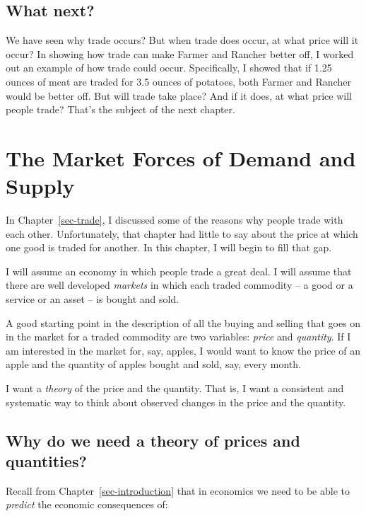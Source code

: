 \documentclass[
  letterpaper,
]{book}
\begin{document}
\section{What next?}\label{what-next}

We have seen why trade occurs? But when trade does occur, at what price
will it occur? In showing how trade can make Farmer and Rancher better
off, I worked out an example of how trade could occur. Specifically, I
showed that if 1.25 ounces of meat are traded for 3.5 ounces of
potatoes, both Farmer and Rancher would be better off. But will trade
take place? And if it does, at what price will people trade? That's the
subject of the next chapter.


\chapter{The Market Forces of Demand and
Supply}\label{sec-supply_demand}

In Chapter~\ref{sec-trade}, I discussed some of the reasons why people
trade with each other. Unfortunately, that chapter had little to say
about the price at which one good is traded for another. In this
chapter, I will begin to fill that gap.

I will assume an economy in which people trade a great deal. I will
assume that there are well developed \emph{markets} in which each traded
commodity -- a good or a service or an asset -- is bought and sold.

A good starting point in the description of all the buying and selling
that goes on in the market for a traded commodity are two variables:
\emph{price} and \emph{quantity}. If I am interested in the market for,
say, apples, I would want to know the price of an apple and the quantity
of apples bought and sold, say, every month.

I want a \emph{theory} of the price and the quantity. That is, I want a
consistent and systematic way to think about observed changes in the
price and the quantity.

\section{Why do we need a theory of prices and
quantities?}\label{why-do-we-need-a-theory-of-prices-and-quantities}

Recall from Chapter~\ref{sec-introduction} that in economics we need to
be able to \emph{predict} the economic consequences of:
\end{document}
